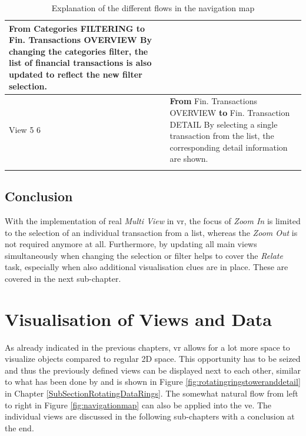 \begin{longtable}{ | p{2.5cm} | p{11.5cm} |}
	\textbf{From} Categories FILTERING \textbf{to} Fin. Transactions OVERVIEW \newline
	By changing the categories filter, the list of financial transactions is also updated to reflect the new filter selection. \\
	\hline
	View 5 \textrightarrow{} 6 &
	\textbf{From} Fin. Transactions OVERVIEW \textbf{to} Fin. Transaction DETAIL \newline
	By selecting a single transaction from the list, the corresponding detail information are shown. \\
	\hline
	\caption{Explanation of the different flows in the navigation map}
	\label{tbl:navigationmap}
\end{longtable}



\subsection{Conclusion}

With the implementation of real \textit{Multi View} in \gls{vr}, the focus of \textit{Zoom In} is limited to the selection of an individual transaction from a list, whereas the \textit{Zoom Out} is not required anymore at all. Furthermore, by updating all main views simultaneously when changing the selection or filter helps to cover the \textit{Relate} task, especially when also additional visualisation clues are in place. These are covered in the next sub-chapter.



\section{Visualisation of Views and Data}

As already indicated in the previous chapters, \gls{vr} allows for a lot more space to visualize objects compared to regular 2D space. This opportunity has to be seized and thus the previously defined views can be displayed next to each other, similar to what has been done by \cite{CodeScience2015} and is shown in Figure \ref{fig:rotatingringstoweranddetail} in Chapter \ref{SubSectionRotatingDataRings}. The somewhat natural flow from left to right in Figure \ref{fig:navigationmap} can also be applied into the \gls{ve}. \newline
The individual views are discussed in the following sub-chapters with a conclusion at the end.


